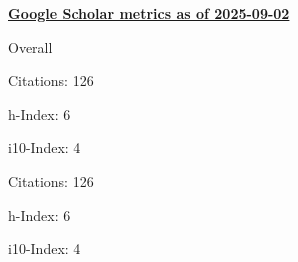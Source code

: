 \textbf{\href{https://scholar.google.it/citations?user=iJDPEaUAAAAJ&hl=it&oi=ao}{Google Scholar metrics as of 2025-09-02}}
\medskip
\centering
\begin{minipage}{.4\textwidth}
    \begin{outerlist}
        \item[] Overall
        \begin{innerlist}
            \item Citations: 126
            \item h-Index: 6
            \item i10-Index: 4
        \end{innerlist}
    \end{outerlist}
\end{minipage}
\hfill
\begin{minipage}{.4\textwidth}
    \begin{outerlist}
        \item[]
        \begin{innerlist}
            \item Citations: 126
            \item h-Index: 6
            \item i10-Index: 4
        \end{innerlist}
    \end{outerlist}
\end{minipage}
\vspace{1em}
